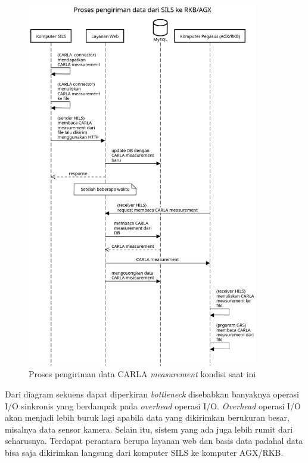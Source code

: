 \begin{figure}[h!]
	\centering
	\includegraphics[width=0.9\textwidth]{resources/chapter-3/sequence-diagram-old-hils-process.png}
	\caption{Proses pengiriman data CARLA \textit{measurement} kondisi saat ini}
	\label{chapter-3-sequence-diagram-old-hils}
\end{figure}

Dari diagram sekuens dapat diperkiran \textit{bottleneck} disebabkan
banyaknya operasi I/O sinkronis yang berdampak pada \textit{overhead} operasi
I/O. \textit{Overhead} operasi I/O akan menjadi lebih buruk lagi apabila data
yang dikirimkan berukuran besar, misalnya data sensor kamera. Selain itu, sistem
yang ada juga lebih rumit dari seharusnya. Terdapat perantara berupa layanan web
dan basis data padahal data bisa saja dikirimkan langsung dari komputer SILS ke
komputer AGX/RKB.

